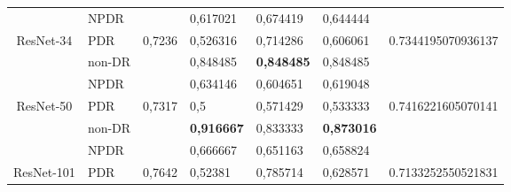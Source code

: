 \begin{table}[hbtp]
\begin{center}
\begin{tabular}{|c|l|c|l|l|l|c|}
			& NPDR                                               &                          & 0,617021                                          & 0,674419                                         & 0,644444                                        &                                      \\ \cline{2-2} \cline{4-6}
			\multirow{-3}{*}{ResNet-34}  & PDR                                                & \multirow{-3}{*}{0,7236} & 0,526316                                          & 0,714286                                         & 0,606061                                        & \multirow{-3}{*}{0.7344195070936137} \\ \hline
			& non-DR                                             &                          & 0,848485                                          & \textbf{0,848485}                                & 0,848485                                        &                                      \\ \cline{2-2} \cline{4-6}
			& NPDR                                               &                          & 0,634146                                          & 0,604651                                         & 0,619048                                        &                                      \\ \cline{2-2} \cline{4-6}
			\multirow{-3}{*}{ResNet-50}  & PDR                                                & \multirow{-3}{*}{0,7317} & 0,5                                               & 0,571429                                         & 0,533333                                        & \multirow{-3}{*}{0.7416221605070141} \\ \hline
			& non-DR                                             &                          & \textbf{0,916667}                                 & 0,833333                                         & \textbf{0,873016}                               &                                      \\ \cline{2-2} \cline{4-6}
			& NPDR                                               &                          & 0,666667                                          & 0,651163                                         & 0,658824                                        &                                      \\ \cline{2-2} \cline{4-6}
			\multirow{-3}{*}{ResNet-101} & PDR                                                & \multirow{-3}{*}{0,7642} & 0,52381                                           & 0,785714                                         & 0,628571                                        & \multirow{-3}{*}{0.7133252550521831} \\ \hline

\end{tabular}
\end{center}
\end{table}
